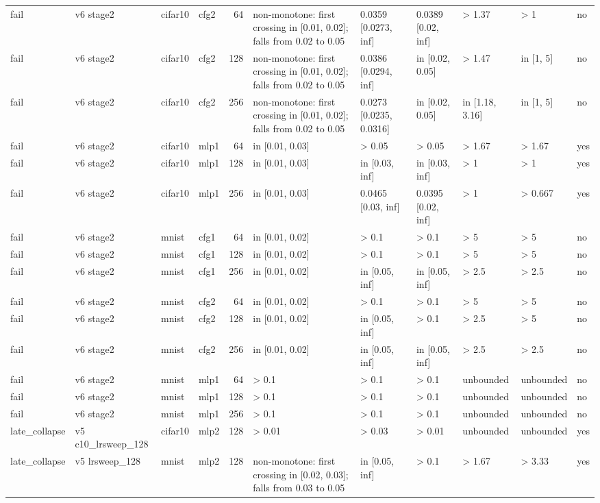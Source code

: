 \begin{table}[htbp]
{\begin{tabular}{@{}llllrllllll@{}}
fail & v6 stage2 & cifar10 & cfg2 & 64 & non-monotone: first crossing in [0.01, 0.02]; falls from 0.02 to 0.05 & 0.0359 [0.0273, inf] & 0.0389 [0.02, inf] & > 1.37 & > 1 & no \\
fail & v6 stage2 & cifar10 & cfg2 & 128 & non-monotone: first crossing in [0.01, 0.02]; falls from 0.02 to 0.05 & 0.0386 [0.0294, inf] & in [0.02, 0.05] & > 1.47 & in [1, 5] & no \\
fail & v6 stage2 & cifar10 & cfg2 & 256 & non-monotone: first crossing in [0.01, 0.02]; falls from 0.02 to 0.05 & 0.0273 [0.0235, 0.0316] & in [0.02, 0.05] & in [1.18, 3.16] & in [1, 5] & no \\
fail & v6 stage2 & cifar10 & mlp1 & 64 & in [0.01, 0.03] & > 0.05 & > 0.05 & > 1.67 & > 1.67 & yes \\
fail & v6 stage2 & cifar10 & mlp1 & 128 & in [0.01, 0.03] & in [0.03, inf] & in [0.03, inf] & > 1 & > 1 & yes \\
fail & v6 stage2 & cifar10 & mlp1 & 256 & in [0.01, 0.03] & 0.0465 [0.03, inf] & 0.0395 [0.02, inf] & > 1 & > 0.667 & yes \\
fail & v6 stage2 & mnist & cfg1 & 64 & in [0.01, 0.02] & > 0.1 & > 0.1 & > 5 & > 5 & no \\
fail & v6 stage2 & mnist & cfg1 & 128 & in [0.01, 0.02] & > 0.1 & > 0.1 & > 5 & > 5 & no \\
fail & v6 stage2 & mnist & cfg1 & 256 & in [0.01, 0.02] & in [0.05, inf] & in [0.05, inf] & > 2.5 & > 2.5 & no \\
fail & v6 stage2 & mnist & cfg2 & 64 & in [0.01, 0.02] & > 0.1 & > 0.1 & > 5 & > 5 & no \\
fail & v6 stage2 & mnist & cfg2 & 128 & in [0.01, 0.02] & in [0.05, inf] & > 0.1 & > 2.5 & > 5 & no \\
fail & v6 stage2 & mnist & cfg2 & 256 & in [0.01, 0.02] & in [0.05, inf] & in [0.05, inf] & > 2.5 & > 2.5 & no \\
fail & v6 stage2 & mnist & mlp1 & 64 & > 0.1 & > 0.1 & > 0.1 & unbounded & unbounded & no \\
fail & v6 stage2 & mnist & mlp1 & 128 & > 0.1 & > 0.1 & > 0.1 & unbounded & unbounded & no \\
fail & v6 stage2 & mnist & mlp1 & 256 & > 0.1 & > 0.1 & > 0.1 & unbounded & unbounded & no \\
late\_collapse & v5 c10\_lrsweep\_128 & cifar10 & mlp2 & 128 & > 0.01 & > 0.03 & > 0.01 & unbounded & unbounded & yes \\
late\_collapse & v5 lrsweep\_128 & mnist & mlp2 & 128 & non-monotone: first crossing in [0.02, 0.03]; falls from 0.03 to 0.05 & in [0.05, inf] & > 0.1 & > 1.67 & > 3.33 & yes \\

\end{tabular}}
\end{table}
